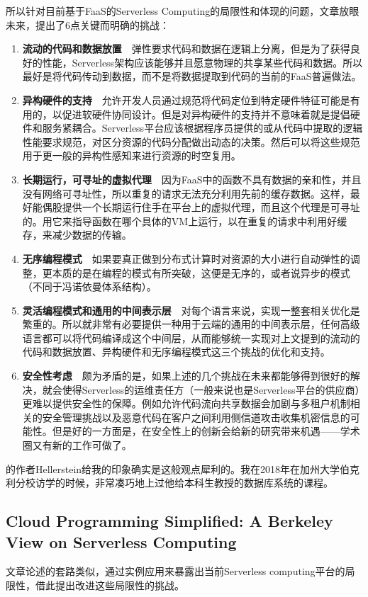 \documentclass[11pt]{article}
\begin{document}
所以针对目前基于FaaS的Serverless Computing的局限性和体现的问题，文章\cite{hellerstein2018serverless}放眼未来，提出了6点关键而明确的挑战：
\begin{enumerate}
	\item \textbf{流动的代码和数据放置}\ \ 弹性要求代码和数据在逻辑上分离，但是为了获得良好的性能，Serverless架构应该能够并且愿意物理的共享某些代码和数据。所以最好是将代码传动到数据，而不是将数据提取到代码的当前的FaaS普遍做法。
	\item \textbf{异构硬件的支持}\ \ 允许开发人员通过规范将代码定位到特定硬件特征可能是有用的，以促进软硬件协同设计。但是对异构硬件的支持并不意味着就是提倡硬件和服务紧耦合。Serverless平台应该根据程序员提供的或从代码中提取的逻辑性能要求规范，对区分资源的代码分配做出动态的决策。然后可以将这些规范用于更一般的异构性感知来进行资源的时空复用\cite{tumanov2016tetrisched}。
	\item \textbf{长期运行，可寻址的虚拟代理}\ \ 因为FaaS中的函数不具有数据的亲和性，并且没有网络可寻址性，所以重复的请求无法充分利用先前的缓存数据。这样，最好能偶股提供一个长期运行住手在平台上的虚拟代理，而且这个代理是可寻址的。用它来指导函数在哪个具体的VM上运行，以在重复的请求中利用好缓存，来减少数据的传输。
	\item \textbf{无序编程模式}\ \ 如果要真正做到分布式计算时对资源的大小进行自动弹性的调整，更本质的是在编程的模式有所突破，这便是无序的，或者说异步的模式（不同于冯诺依曼体系结构）。
	\item \textbf{灵活编程模式和通用的中间表示层}\ \ 对每个语言来说，实现一整套相关优化是繁重的。所以就非常有必要提供一种用于云端的通用的中间表示层，任何高级语言都可以将代码编译成这个中间层，从而能够统一实现对上文提到的流动的代码和数据放置、异构硬件和无序编程模式这三个挑战的优化和支持。
	\item \textbf{安全性考虑}\ \ 颇为矛盾的是，如果上述的几个挑战在未来都能够得到很好的解决，就会使得Serverless的运维责任方（一般来说也是Serverless平台的供应商）更难以提供安全性的保障。例如允许代码流向共享数据会加剧与多租户机制相关的安全管理挑战以及恶意代码在客户之间利用侧信道攻击收集机密信息的可能性。但是好的一方面是，在安全性上的创新会给新的研究带来机遇——学术圈又有新的工作可做了。
\end{enumerate}

\cite{hellerstein2018serverless}的作者Hellerstein给我的印象确实是这般观点犀利的。我在2018年在加州大学伯克利分校访学的时候，非常凑巧地上过他给本科生教授的数据库系统的课程。

\subsection{Cloud Programming Simplified:
A Berkeley View on Serverless Computing}
文章\cite{jonas2019cloud}论述的套路类似，通过实例应用来暴露出当前Serverless computing平台的局限性，借此提出改进这些局限性的挑战。
\end{document}

